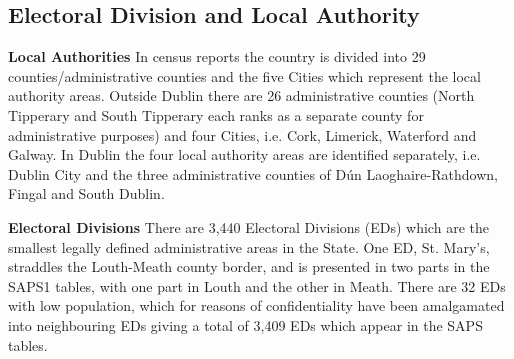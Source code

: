 \subsection{Electoral Division and Local Authority}
\textbf{Local Authorities}
In census reports the country is divided into 29 counties/administrative counties and the five Cities which represent the
local authority areas. Outside Dublin there are 26 administrative counties (North Tipperary and South Tipperary each
ranks as a separate county for administrative purposes) and four Cities, i.e. Cork, Limerick, Waterford and Galway. In
Dublin the four local authority areas are identified separately, i.e. Dublin City and the three administrative counties of
Dún Laoghaire-Rathdown, Fingal and South Dublin.

\textbf{Electoral Divisions}
There are 3,440 Electoral Divisions (EDs) which are the smallest legally defined administrative areas in the State. One ED, St. Mary's, straddles the Louth-Meath county border, and is presented in two parts in the SAPS1 tables, with one part in Louth and the other in Meath. There are 32 EDs with low population, which for reasons of confidentiality have been amalgamated into neighbouring EDs giving a total of 3,409 EDs which appear in the SAPS tables.

